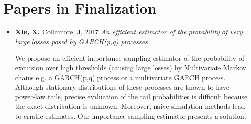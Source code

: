 \documentclass[a4paper]{twentysecondcv} %
\begin{document}
\pagebreak
\makeprofile %

\section{Papers in Finalization}
\begin{itemize}
\item {\bf Xie, X.} Collamore, J, 2017
  {\it An efficient estimator of the probability of very large losses posed by
    GARCH(p,q) processes}

  {\small
    We propose an efficient importance sampling estimator of the
    probability of excursion over high thresholds (causing large
    losses) by Multivariate Markov chains e.g. a GARCH(p,q) process or
    a multivariate GARCH process.
    Although stationary distributions of these processes are known
    to have power-law tails, precise evaluation of the tail
    probabilities is difficult because the exact distribution is
    unknown. Moreover, naive simulation methods lead to erratic
    estimates. Our importance sampling estimator presents a solution.
  }
\end{itemize}






\end{document}
